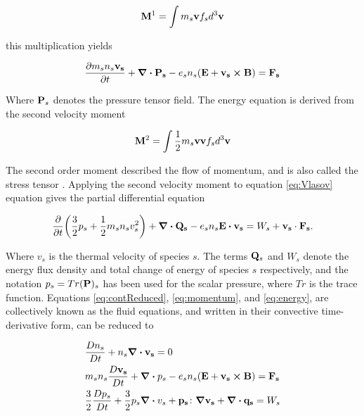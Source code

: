 \begin{equation}\label{eq:firstmoment}
    \vb{M}^1 = \int m_s \vb{v} f_s d^3 \vb{v}
\end{equation}

this multiplication yields

\begin{equation}\label{eq:momentum}
     \pdv{m_s n_s \vb{v_s}}{t} + \div{\vb{P_s}} - e_s n_s (\vb{E} + \vb{v_s} \cross \vb{B}) = \vb{F_s}
\end{equation}

Where $\vb{P}_s$ denotes the pressure tensor field. The energy equation is derived from the second velocity moment

\begin{equation}
    \vb{M}^2 = \int \frac{1}{2} m_s \vb{v} \vb{v} f_s d^3 \vb{v}
\end{equation}

The second order moment described the flow of momentum, and is also called the stress tensor \parencite[Ch. 3]{Fitzpatrick2015}. Applying the second velocity moment to equation \eqref{eq:Vlasov} equation gives the partial differential equation

\begin{equation}\label{eq:energy}
    \pdv{t} (\frac{3}{2} p_s + \frac{1}{2} m_s n_s v_s^2) + \div{\vb{Q_s}} - e_s n_s \vb{E} \vdot \vb{v_s} = W_s + \vb{v_s} \cdot \vb{F_s}.   
\end{equation}

Where $v_s$ is the thermal velocity of species $s$. The terms $\vb{Q}_s$ and ${W}_s$ denote the energy flux density and total change of energy of species $s$ respectively, and the notation $p_s = Tr(\vb{P})_s$ has been used for the scalar pressure, where $Tr$ is the trace function. Equations \eqref{eq:contReduced}, \eqref{eq:momentum}, and \eqref{eq:energy}, are collectively known as the fluid equations, and written in their convective time-derivative form, can be reduced to

\begin{subequations}
    \begin{align}
        &\frac{D n_s}{D t} + n_s \div{\vb{v_s}} = 0 \\
        &m_s n_s \frac{D \vb{v_s}}{D t} + \div{p_s} - e_s n_s ( \vb{E} + \vb{v_s} \cross \vb{B}) = \vb{F_s} \\
        &\frac{3}{2} \frac{D p_s}{D t} + \frac{3}{2} p_s \div{v_s} + \vb{p_s} \colon \grad{\vb{v_s}} + \div{\vb{q_s}} = W_s
    \end{align}
\end{subequations}

